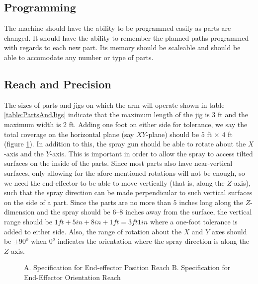 \documentclass[a4paper,10pt]{article}
\begin{document}
\normalsize
\subsection{Programming}
The machine should have the ability to be programmed easily as parts are changed. It should have the ability to remember the planned
paths programmed with regards to each new part. Its memory should be scaleable and should be able to accomodate any number or type of
parts.
\subsection{Reach and Precision}  
The sizes of parts and jigs on which the arm will operate shown in table \ref{table:PartsAndJigs} indicate that the maximum length
of the jig is $3$ ft and the maximum width is $2$ ft. Adding one foot on either side for tolerance, we say the total coverage 
on the horizontal plane (say $XY$-plane) should be $5$ ft $\times$ $4$ ft (figure \ref{fig:Reach}). In addition to this, the spray gun should be able
to rotate about the $X$-axis and the $Y$-axis. This is important in order to allow the spray to access tilted surfaces on 
the inside of the parts. Since most parts also have near-vertical surfaces, only allowing for the afore-mentioned rotations will not
be enough, so we need the end-effector to be able to move vertically (that is, along the $Z$-axis), such that the spray direction
can be made perpendicular to such vertical surfaces on the side of a part. Since the parts are no more than $5$ inches long along the $Z$-dimension
and the spray should be $6$--$8$ inches away from the surface, the vertical range should be $1ft+5in+8in+1ft=3ft 1in$ where a one-foot tolerance is added to either side. Also, the
range of rotation about the $X$ and $Y$ axes should be $\pm 90^o$ when $0^o$ indicates the orientation where the spray direction
is along the $Z$-axis.
\begin{figure}[ht!]
\centering {}
\captionsetup{singlelinecheck=off}
\caption[jigs]{A. Specification for End-effector Position Reach B. Specification for End-Effector Orientation Reach}
\label{fig:Reach} 
\end{figure}
\end{document}
